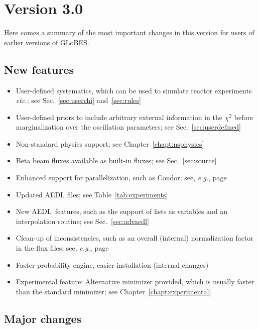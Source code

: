\documentclass[a4paper,12pt,twoside]{book}
\newcommand{\eg}{{\it e.g.}}
\newcommand{\etc}{{\it etc.}}
\newcommand{\Sec}{Sec.}
\newcommand{\Chapt}{Chapter}
\newcommand{\Tab}{Table}
\newcommand{\GLOBES}{{\sf GLoBES}}
\newcommand{\AEDL}{{\sf AEDL}}
\begin{document}
\section*{Version 3.0}

Here comes a summary of the most important changes in this version for users of earlier
versions of \GLOBES .

\subsection*{New features}

\begin{itemize}
 \item
  User-defined systematics, which can be used to simulate reactor experiments \etc ; see \Sec~\ref{sec:userchi}
and~\ref{sec:rules}
 \item
  User-defined priors to include arbitrary external information in the $\chi^2$ before
marginalization over the oscillation parameters; see \Sec~\ref{sec:userdefined} 
\item
  Non-standard physics support; see \Chapt~\ref{chapt:nsphysics}
\item
  Beta beam fluxes available as built-in fluxes; see \Sec~\ref{sec:source}
\item
  Enhanced support for parallelization, such as Condor; see, \eg, page~\pageref{sec:condor}
\item
  Updated AEDL files; see \Tab~\ref{tab:experiments}
\item
 New \AEDL\ features, such as the support of lists as variables and an interpolation
routine; see \Sec~\ref{sec:advaedl}
\item
 Clean-up of inconsistencies, such as an overall (internal) normalization factor in the flux files;
see, \eg, page~\pageref{app:flux}
\item
  Faster probability engine, easier installation (internal changes)
\item
  Experimental feature: Alternative minimizer provided, which is usually faster than
the standard minimizer; see \Chapt~\ref{chapt:experimental}
\end{itemize}

\subsection*{Major changes}
\end{document}
